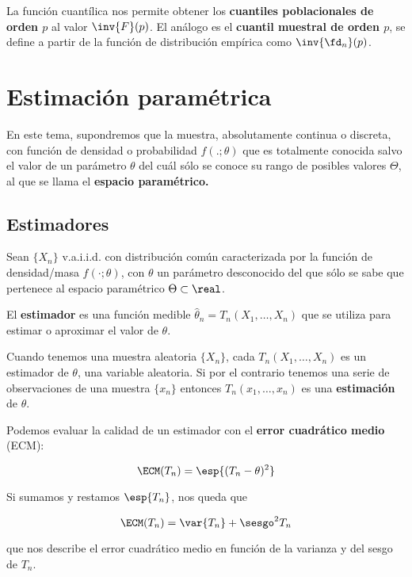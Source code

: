 \documentclass{apuntes}
\begin{document}
La función cuantílica nos permite obtener los \textbf{cuantiles poblacionales de orden $p$}  al valor $\inv{F}(p)$. El análogo es el \textbf{cuantil muestral de orden $p$},  se define a partir de la función de distribución empírica como $\inv{\fd_n}(p)$.

\chapter{Estimación paramétrica}

En este tema, supondremos que la muestra, absolutamente continua o discreta, con función de densidad o probabilidad $f(.;\theta)$ que es totalmente conocida salvo el valor de un parámetro $\theta$ del cuál sólo se conoce su rango de posibles valores $\Theta$, al que se llama el \textbf{espacio paramétrico.}

\section{Estimadores}

\begin{defn}[Estimador] Sean $\{X_n\}$ v.a.i.i.d. con distribución común caracterizada por la función de densidad/masa $f(\cdot;\theta)$, con $\theta$ un parámetro desconocido del que sólo se sabe que pertenece al espacio paramétrico $\Theta \subset \real$.

El \textbf{estimador} es una función medible $\hat{\theta}_n = T_n(X_1,\dotsc, X_n)$ que se utiliza para estimar o aproximar el valor de $\theta$.
\end{defn}

Cuando tenemos una muestra aleatoria $\{X_n\}$, cada $T_n(X_1, \dotsc, X_n)$ es un estimador de $\theta$, una variable aleatoria. Si por el contrario tenemos una serie de observaciones de una muestra $\{x_n\}$ entonces $T_n(x_1,\dotsc,x_n)$ es una \textbf{estimación} de $\theta$.

Podemos evaluar la calidad de un estimador con el \textbf{error cuadrático medio} (ECM):

\[ \ECM (T_n) = \esp{(T_n - \theta)^2}\]

Si sumamos y restamos $\esp{T_n}$, nos queda que 

\[ \ECM (T_n) = \var{T_n} + \sesgo^2 T_n \]

que nos describe el error cuadrático medio en función de la varianza y del sesgo de $T_n$.
\end{document}
